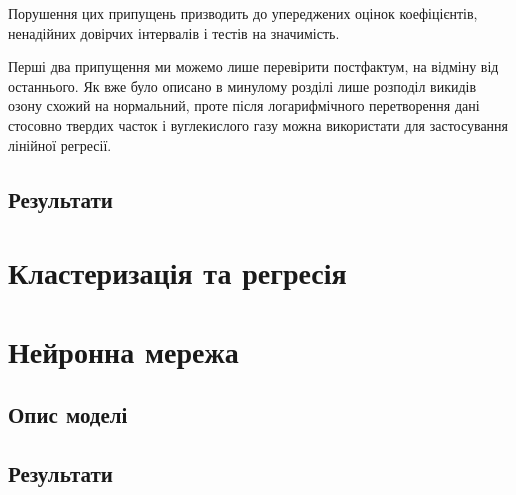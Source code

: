 Порушення цих припущень призводить до упереджених оцінок коефіцієнтів, ненадійних довірчих інтервалів і тестів на значимість.

Перші два припущення ми можемо лише перевірити постфактум, на відміну від останнього. 
Як вже було описано в минулому розділі лише розподіл викидів озону схожий на нормальний, проте після логарифмічного перетворення дані стосовно твердих часток і вуглекислого газу можна використати для застосування лінійної регресії.

\subsection{Результати}

\section{Кластеризація та регресія}


\section{Нейронна мережа}



\subsection{Опис моделі}

\subsection{Результати}

